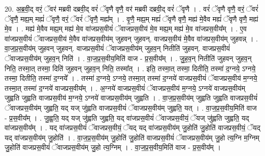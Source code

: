\documentclass[17pt]{extarticle}
\begin{document}
20. अ॒ब्र॒वी॒द् वरं॒ ॅवर॑ मब्रवी दब्रवी॒द् वरं॑ ॅवृणै वृणै॒ वर॑ मब्रवी दब्रवी॒द् वरं॑ ॅवृणै । . वरं॑ ॅवृणै वृणै॒ वरं॒ ॅवरं॑ ॅवृणै॒ मह्य॒म् मह्यं॑ ॅवृणै॒ वरं॒ ॅवरं॑ ॅवृणै॒ मह्य᳚म् । . वृ॒णै॒ मह्य॒म् मह्यं॑ ॅवृणै वृणै॒ मह्य॑ मे॒वैव मह्यं॑ ॅवृणै वृणै॒ मह्य॑ मे॒व । . मह्य॑ मे॒वैव मह्य॒म् मह्य॑ मे॒व वा॑जप्रस॒वीयं॑ ॅवाजप्रस॒वीय॑ मे॒व मह्य॒म् मह्य॑ मे॒व वा॑जप्रस॒वीय᳚म् । . ए॒व वा॑जप्रस॒वीयं॑ ॅवाजप्रस॒वीय॑ मे॒वैव वा॑जप्रस॒वीय॑म् जुहवन् जुहवन्. वाजप्रस॒वीय॑ मे॒वैव वा॑जप्रस॒वीय॑म् जुहवन्न् । . वा॒ज॒प्र॒स॒वीय॑म् जुहवन् जुहवन्. वाजप्रस॒वीयं॑ ॅवाजप्रस॒वीय॑म् जुहव॒न् नितीति॑ जुहवन्. वाजप्रस॒वीयं॑ ॅवाजप्रस॒वीय॑म् जुहव॒न् निति॑ । . वा॒ज॒प्र॒स॒वीय॒मिति॑ वाज - प्र॒स॒वीय᳚म् । . जु॒ह॒व॒न् नितीति॑ जुहवन् जुहव॒न् निति॒ तस्मा॒त् तस्मा॒ दिति॑ जुहवन् जुहव॒न् निति॒ तस्मा᳚त् । . इति॒ तस्मा॒त् तस्मा॒ दितीति॒ तस्मा॑ द॒ग्नये॒ ऽग्नये॒ तस्मा॒ दितीति॒ तस्मा॑ द॒ग्नये᳚ । . तस्मा॑ द॒ग्नये॒ ऽग्नये॒ तस्मा॒त् तस्मा॑ द॒ग्नये॑ वाजप्रस॒वीयं॑ ॅवाजप्रस॒वीय॑ म॒ग्नये॒ तस्मा॒त् तस्मा॑ द॒ग्नये॑ वाजप्रस॒वीय᳚म् । . अ॒ग्नये॑ वाजप्रस॒वीयं॑ ॅवाजप्रस॒वीय॑ म॒ग्नये॒ ऽग्नये॑ वाजप्रस॒वीय॑म् जुह्वति जुह्वति वाजप्रस॒वीय॑ म॒ग्नये॒ ऽग्नये॑ वाजप्रस॒वीय॑म् जुह्वति । . वा॒ज॒प्र॒स॒वीय॑म् जुह्वति जुह्वति वाजप्रस॒वीयं॑ ॅवाजप्रस॒वीय॑म् जुह्वति॒ यद् यज् जु॑ह्वति वाजप्रस॒वीयं॑ ॅवाजप्रस॒वीय॑म् जुह्वति॒ यत् । . वा॒ज॒प्र॒स॒वीय॒मिति॑ वाज - प्र॒स॒वीय᳚म् । . जु॒ह्व॒ति॒ यद् यज् जु॑ह्वति जुह्वति॒ यद् वा॑जप्रस॒वीयं॑ ॅवाजप्रस॒वीयं॒ ॅयज् जु॑ह्वति जुह्वति॒ यद् वा॑जप्रस॒वीय᳚म् । . यद् वा॑जप्रस॒वीयं॑ ॅवाजप्रस॒वीयं॒ ॅयद् यद् वा॑जप्रस॒वीय॑म् जु॒होति॑ जु॒होति॑ वाजप्रस॒वीयं॒ ॅयद् यद् वा॑जप्रस॒वीय॑म् जु॒होति॑ । . वा॒ज॒प्र॒स॒वीय॑म् जु॒होति॑ जु॒होति॑ वाजप्रस॒वीयं॑ ॅवाजप्रस॒वीय॑म् जु॒हो त्य॒ग्नि म॒ग्निम् जु॒होति॑ वाजप्रस॒वीयं॑ ॅवाजप्रस॒वीय॑म् जु॒हो त्य॒ग्निम् । . वा॒ज॒प्र॒स॒वीय॒मिति॑ वाज - प्र॒स॒वीय᳚म् । \newline
\end{document}
